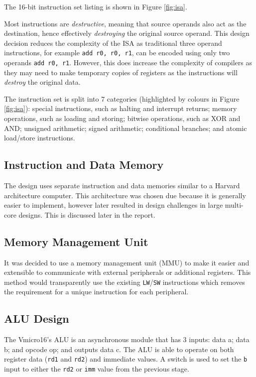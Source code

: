 \noindent
The 16-bit instruction set listing is shown in Figure \ref{fig:isa}.

Most instructions are \textit{destructive}, meaning that source operands also act as the destination, hence effectively \textit{destroying} the original source operand. This design decision reduces the complexity of the ISA as traditional three operand instructions, for example \verb|add r0, r0, r1|, can be encoded using only two operands \verb|add r0, r1|. However, this does increase the complexity of compilers as they may need to make temporary copies of registers as the instructions will \textit{destroy} the original data.

The instruction set is split into 7 categories (highlighted by colours in Figure \ref{fig:isa}): special instructions, such as halting and interrupt returns; memory operations, such as loading and storing; bitwise operations, such as XOR and AND; unsigned arithmetic; signed arithmetic; conditional branches; and atomic load/store instructions.


\subsection{Instruction and Data Memory}
The design uses separate instruction and data memories similar to a Harvard architecture computer. This architecture was chosen due because it is generally easier to implement, however later resulted in design challenges in large multi-core designs. This is discussed later in the report.

\subsection{Memory Management Unit}
It was decided to use a memory management unit (MMU) to make it easier and extensible to communicate with external peripherals or additional registers. This method would transparently use the existing \verb|LW|/\verb|SW| instructions which removes the requirement for a unique instruction for each peripheral. 


\subsection{ALU Design}
The Vmicro16's ALU is an asynchronous module that has 3 inputs: data a; data b; and opcode op; and outputs data c.
The ALU is able to operate on both register data (\verb|rd1| and \verb|rd2|) and immediate values. A switch is used to set the \verb|b| input to either the \verb|rd2| or \verb|imm| value from the previous stage.

